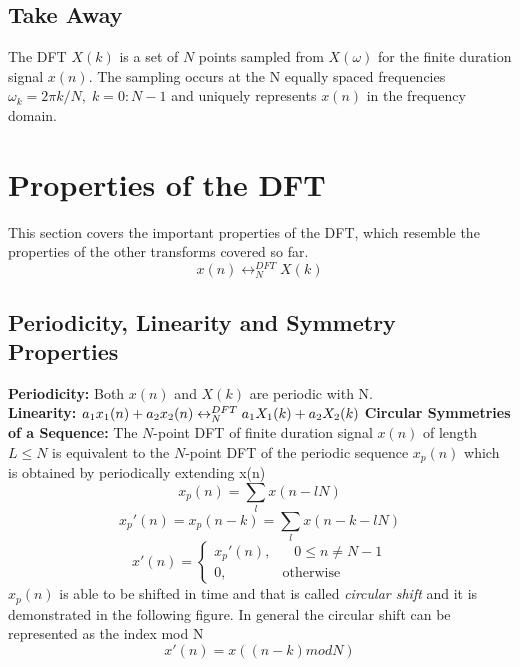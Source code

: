 \documentclass{article} %
\begin{document}
	\subsection{Take Away}
	The DFT $X(k)$ is a set of $N$ points sampled from $X(\omega)$ for the finite duration signal $x(n)$. The sampling occurs at the N equally spaced frequencies $\omega_k = 2\pi k/N, \;k=0:N-1$ and uniquely represents $x(n)$ in the frequency domain. 
	\section{Properties of the DFT}
	This section covers the important properties of the DFT, which resemble the properties of the other transforms covered so far. 
	\begin{equation}
	x(n) \leftrightarrow_N^{DFT} X(k)
	\end{equation}
	\subsection{Periodicity, Linearity and Symmetry Properties}
	\textbf{Periodicity:} Both $x(n)$ and $X(k)$ are periodic with N.\\
	\textbf{Linearity:} $a_1x_1(n) + a_2x_2(n)\\ \leftrightarrow_N^{DFT} a_1X_1(k) + a_2X_2(k)$
	\textbf{Circular Symmetries of a Sequence:} The $N$-point DFT of finite duration signal $x(n)$ of length $L \le N$ is equivalent to the $N$-point DFT of the periodic sequence $x_p(n)$ which is obtained by periodically extending x(n)
	\begin{equation}
	x_p(n) = \sum_l x(n-lN)
	\end{equation}
	\begin{equation}
	x_p'(n) = x_p(n-k) = \sum_l x(n-k-lN)
	\end{equation}
	\begin{equation}
	x'(n) =  \begin{cases}
      		x_p'(n), & \;\;\; 0 \le n \ne N-1 \\
      		0, & \text{otherwise}
    	\end{cases} 
	\end{equation}
	$x_p(n)$ is able to be shifted in time and that is called \textit{circular shift} and it is demonstrated in the following figure. In general the circular shift can be represented as the index mod N
	\begin{equation}
	x'(n) = x((n-k) mod N)
	\end{equation}
\end{document}
